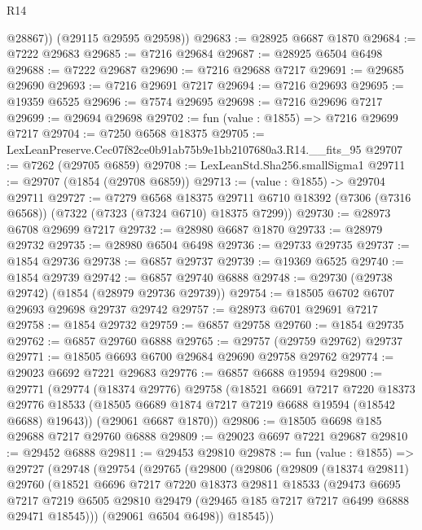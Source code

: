 \begin{lexlean}{R14}
\begin{coremodule}
          @28867))
      (@29115 @29595 @29598))
@29683 := @28925 @6687 @1870
@29684 := @7222 @29683
@29685 := @7216 @29684
@29687 := @28925 @6504 @6498
@29688 := @7222 @29687
@29690 := @7216 @29688 @7217
@29691 := @29685 @29690
@29693 := @7216 @29691 @7217
@29694 := @7216 @29693
@29695 := @19359 @6525
@29696 := @7574 @29695
@29698 := @7216 @29696 @7217
@29699 := @29694 @29698
@29702 := fun (value : @1855) => @7216 @29699 @7217
@29704 := @7250 @6568 @18375
@29705 := LexLeanPreserve.Cec07f82ce0b91ab75b9e1bb2107680a3.R14.__fits_95
@29707 := @7262 (@29705 @6859)
@29708 := LexLeanStd.Sha256.smallSigma1
@29711 := @29707 (@1854 (@29708 @6859))
@29713 := (value : @1855) -> @29704 @29711
@29727 := @7279
    @6568
    @18375
    @29711
    @6710
    @18392
    (@7306 (@7316 @6568))
    (@7322 (@7323 (@7324 @6710) @18375 @7299))
@29730 := @28973 @6708 @29699 @7217
@29732 := @28980 @6687 @1870
@29733 := @28979 @29732
@29735 := @28980 @6504 @6498
@29736 := @29733 @29735
@29737 := @1854 @29736
@29738 := @6857 @29737
@29739 := @19369 @6525
@29740 := @1854 @29739
@29742 := @6857 @29740 @6888
@29748 := @29730 (@29738 @29742) (@1854 (@28979 @29736 @29739))
@29754 := @18505 @6702 @6707 @29693 @29698 @29737 @29742
@29757 := @28973 @6701 @29691 @7217
@29758 := @1854 @29732
@29759 := @6857 @29758
@29760 := @1854 @29735
@29762 := @6857 @29760 @6888
@29765 := @29757 (@29759 @29762) @29737
@29771 := @18505 @6693 @6700 @29684 @29690 @29758 @29762
@29774 := @29023 @6692 @7221 @29683
@29776 := @6857 @6688 @19594
@29800 := @29771
    (@29774
      (@18374 @29776)
      @29758
      (@18521
        @6691
        @7217
        @7220
        @18373
        @29776
        @18533
        (@18505 @6689 @1874 @7217 @7219 @6688 @19594 (@18542 @6688) @19643))
      (@29061 @6687 @1870))
@29806 := @18505 @6698 @185 @29688 @7217 @29760 @6888
@29809 := @29023 @6697 @7221 @29687
@29810 := @29452 @6888
@29811 := @29453 @29810
@29878 := fun (value : @1855) =>
  @29727
    (@29748
      (@29754
        (@29765
          (@29800
            (@29806
              (@29809
                (@18374 @29811)
                @29760
                (@18521
                  @6696
                  @7217
                  @7220
                  @18373
                  @29811
                  @18533
                  (@29473
                    @6695
                    @7217
                    @7219
                    @6505
                    @29810
                    @29479
                    (@29465 @185 @7217 @7217 @6499 @6888 @29471 @18545)))
                (@29061 @6504 @6498))
              @18545))

\end{coremodule}
\end{lexlean}
